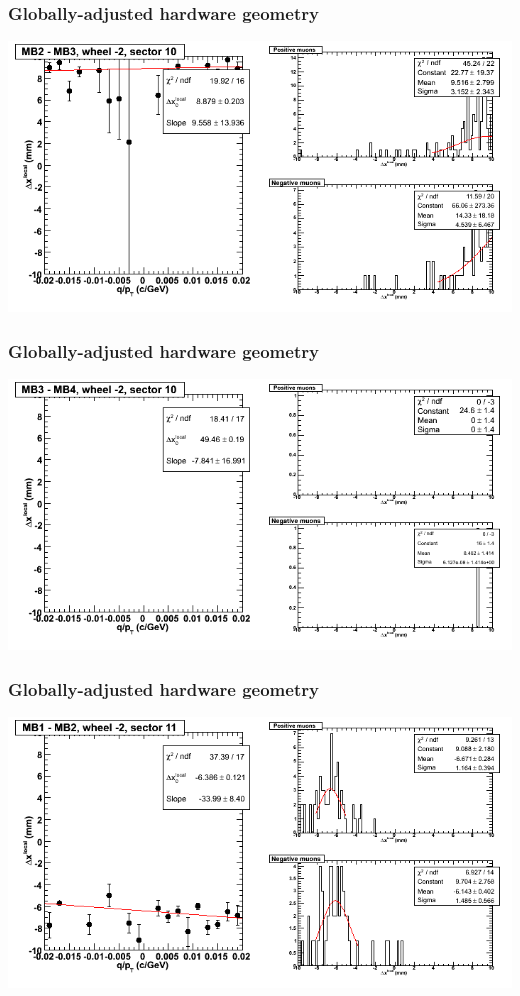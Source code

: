 \documentclass[compress]{beamer}
\begin{document}
\begin{frame}
\frametitle{Globally-adjusted hardware geometry}
\includegraphics[width=\linewidth]{NOV4_segdiffs_HW/dt13_resid_A_10_23.png}
\end{frame}

\begin{frame}
\frametitle{Globally-adjusted hardware geometry}
\includegraphics[width=\linewidth]{NOV4_segdiffs_HW/dt13_resid_A_10_34.png}
\end{frame}

\begin{frame}
\frametitle{Globally-adjusted hardware geometry}
\includegraphics[width=\linewidth]{NOV4_segdiffs_HW/dt13_resid_A_11_12.png}
\end{frame}
\end{document}
